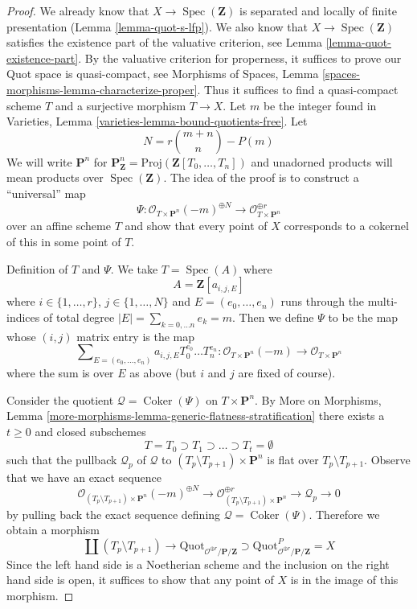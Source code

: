 \documentclass{stacks-project}
\theoremstyle{plain}
\theoremstyle{definition}
\theoremstyle{remark}
\numberwithin{equation}{subsection}
\def\Spec{\mathop{\mathrm{Spec}}}
\def\Coker{\mathop{\mathrm{Coker}}}
\def\Quotfunctor{\mathrm{Quot}}
\begin{document}
\begin{proof}
We already know that $X \to \Spec(\mathbf{Z})$ is separated and
locally of finite presentation (Lemma \ref{lemma-quot-s-lfp}).
We also know that $X \to \Spec(\mathbf{Z})$ satisfies the
existence part of the valuative criterion, see
Lemma \ref{lemma-quot-existence-part}.
By the valuative criterion for properness, it suffices to
prove our Quot space is quasi-compact, see
Morphisms of Spaces,
Lemma \ref{spaces-morphisms-lemma-characterize-proper}.
Thus it suffices to find a quasi-compact scheme $T$ and a surjective
morphism $T \to X$. Let $m$ be the integer found in
Varieties, Lemma \ref{varieties-lemma-bound-quotients-free}.
Let
$$
N = r{m + n \choose n} - P(m)
$$
We will write $\mathbf{P}^n$ for
$\mathbf{P}^n_\mathbf{Z} = \text{Proj}(\mathbf{Z}[T_0, \ldots, T_n])$
and unadorned products will mean products over $\Spec(\mathbf{Z})$.
The idea of the proof is to construct a ``universal'' map
$$
\Psi :
\mathcal{O}_{T \times \mathbf{P}^n}(-m)^{\oplus N}
\longrightarrow
\mathcal{O}_{T \times \mathbf{P}^n}^{\oplus r}
$$
over an affine scheme $T$ and show that every point of $X$
corresponds to a cokernel of this in some point of $T$.

\medskip\noindent
Definition of $T$ and $\Psi$. We take $T = \Spec(A)$ where
$$
A = \mathbf{Z}[a_{i, j, E}]
$$
where $i \in \{1, \ldots, r\}$, $j \in \{1, \ldots, N\}$
and $E = (e_0, \ldots, e_n)$ runs through the multi-indices
of total degree $|E| = \sum_{k = 0, \ldots n} e_k = m$.
Then we define $\Psi$ to be the map whose $(i, j)$ matrix
entry is the map
$$
\sum\nolimits_{E = (e_0, \ldots, e_n)}
a_{i, j, E} T_0^{e_0} \ldots T_n^{e_n} :
\mathcal{O}_{T \times \mathbf{P}^n}(-m)
\longrightarrow
\mathcal{O}_{T \times \mathbf{P}^n}
$$
where the sum is over $E$ as above (but $i$ and $j$ are fixed of course).

\medskip\noindent
Consider the quotient $\mathcal{Q} = \Coker(\Psi)$ on $T \times \mathbf{P}^n$.
By More on Morphisms, Lemma
\ref{more-morphisms-lemma-generic-flatness-stratification}
there exists a $t \geq 0$ and closed subschemes
$$
T = T_0 \supset T_1 \supset \ldots \supset T_t = \emptyset
$$
such that the pullback $\mathcal{Q}_p$ of $\mathcal{Q}$ to
$(T_p \setminus T_{p + 1}) \times \mathbf{P}^n$ is flat over
$T_p \setminus T_{p + 1}$. Observe that we
have an exact sequence
$$
\mathcal{O}_{(T_p \setminus T_{p + 1}) \times \mathbf{P}^n}(-m)^{\oplus N}
\to
\mathcal{O}_{(T_p \setminus T_{p + 1}) \times \mathbf{P}^n}^{\oplus r}
\to
\mathcal{Q}_p
\to
0
$$
by pulling back the exact sequence defining $\mathcal{Q} = \Coker(\Psi)$.
Therefore we obtain a morphism
$$
\coprod (T_p \setminus T_{p + 1})
\longrightarrow
\Quotfunctor_{\mathcal{O}^{\oplus r}/\mathbf{P}/\mathbf{Z}}
\supset
\Quotfunctor^P_{\mathcal{O}^{\oplus r}/\mathbf{P}/\mathbf{Z}} = X
$$
Since the left hand side is a Noetherian scheme and the inclusion
on the right hand side is open, it
suffices to show that any point of $X$ is in the image of this morphism.


\end{proof}
\end{document}
